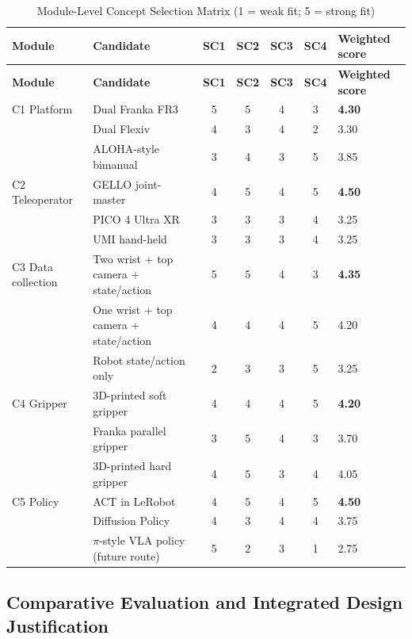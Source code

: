 \documentclass[12pt, letterpaper]{article}
\begin{document}
\begin{longtable}{p{}p{}ccccp{}}
\caption{Module-Level Concept Selection Matrix (1 = weak fit; 5 = strong fit)}\label{tab:module-selection-matrix}\\
\toprule
\textbf{Module} & \textbf{Candidate} & \textbf{SC1} & \textbf{SC2} & \textbf{SC3} & \textbf{SC4} & \textbf{Weighted score} \\
\midrule
\endfirsthead
\toprule
\textbf{Module} & \textbf{Candidate} & \textbf{SC1} & \textbf{SC2} & \textbf{SC3} & \textbf{SC4} & \textbf{Weighted score} \\
\midrule
\endhead
C1 Platform & Dual Franka FR3 & 5 & 5 & 4 & 3 & \textbf{4.30 } \\
 & Dual Flexiv & 4 & 3 & 4 & 2 & 3.30 \\
 & ALOHA-style bimanual & 3 & 4 & 3 & 5 & 3.85 \\
\midrule
C2 Teleoperator & GELLO joint-master & 4 & 5 & 4 & 5 & \textbf{4.50} \\
 & PICO 4 Ultra XR & 3 & 3 & 3 & 4 & 3.25 \\
 & UMI hand-held & 3 & 3 & 3 & 4 & 3.25 \\
\midrule
C3 Data collection & Two wrist + top camera + state/action & 5 & 5 & 4 & 3 & \textbf{4.35} \\
 & One wrist + top camera + state/action & 4 & 4 & 4 & 5 & 4.20 \\
 & Robot state/action only & 2 & 3 & 3 & 5 & 3.25 \\
\midrule
C4 Gripper & 3D-printed soft gripper & 4 & 4 & 4 & 5 & \textbf{4.20} \\
 & Franka parallel gripper & 3 & 5 & 4 & 3 & 3.70 \\
 & 3D-printed hard gripper & 4 & 5 & 3 & 4 & 4.05 \\
\midrule
C5 Policy & ACT in LeRobot & 4 & 5 & 4 & 5 & \textbf{4.50} \\
 & Diffusion Policy & 4 & 3 & 4 & 4 & 3.75 \\
 & $\pi$-style VLA policy (future route) & 5 & 2 & 3 & 1 & 2.75 \\
\bottomrule
\end{longtable}

\subsection{Comparative Evaluation and Integrated Design Justification}
\end{document}
